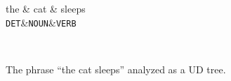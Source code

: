 \begin{figure}[H]
\centering



    \begin{dependency}
        \begin{deptext}[column sep=0.4cm]
              the \& cat \& sleeps \\
            {\tt DET}\&{\tt NOUN}\&{\tt VERB}\\
        \end{deptext}
    \end{dependency} \\

\caption{The phrase ``the cat sleeps'' analyzed as a UD tree.} %
\label{fig:cat_sleeps_ud}
\end{figure}

